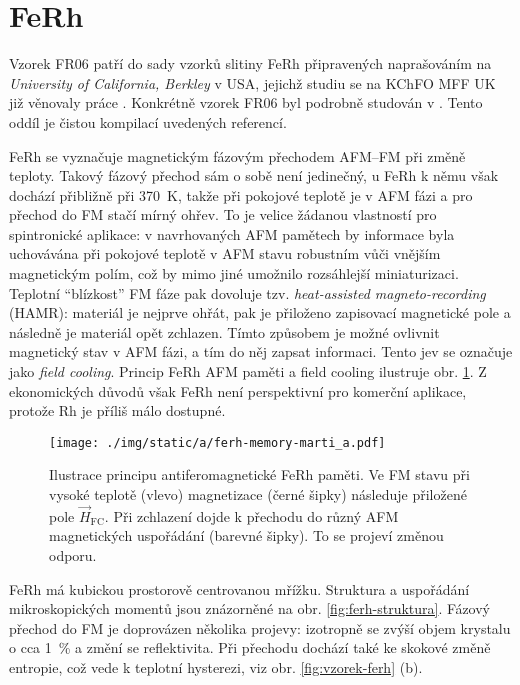 \section{FeRh}
\label{chap:vzorek-ferh}

Vzorek FR06 patří do sady vzorků slitiny FeRh připravených naprašováním na \emph{University of California, Berkley} v USA, jejichž studiu se na KChFO MFF UK již věnovaly práce \cite{brajerLaserovaSpektroskopieMaterialu2015,saidlUltrarychlaLaserovaSpektroskopie2018,kubascikMagnetooptickeStudiumAntiferomagnetickych2019,saidlInvestigationMagnetostructuralPhase2016}.
Konkrétně vzorek FR06 byl podrobně studován v \cite{saidlUltrarychlaLaserovaSpektroskopie2018,kubascikMagnetooptickeStudiumAntiferomagnetickych2019}.
Tento oddíl je čistou kompilací uvedených referencí.

FeRh se vyznačuje magnetickým fázovým přechodem AFM--FM při změ\-ně teploty.
Takový fázový přechod sám o sobě není jedinečný, u FeRh k němu však dochází přibližně při \SI{370}{\kelvin}, takže při pokojové teplotě je v AFM fázi a pro přechod do FM stačí mírný ohřev.
To je velice žádanou vlastností pro spintronické aplikace: v navrhovaných AFM pamětech by informace byla uchovávána při pokojové teplotě v AFM stavu robustním vůči vnějším magnetickým polím, což by mimo jiné umožnilo rozsáhlejší miniaturizaci.
Teplotní ``blízkost'' FM fáze pak dovoluje tzv. \emph{heat-assisted magneto-recording} (HAMR): materiál je nejprve ohřát, pak je přiloženo zapisovací magnetické pole a následně je materiál opět zchlazen.
Tímto způsobem je možné ovlivnit magnetický stav v AFM fázi, a tím do něj zapsat informaci.
Tento jev se označuje jako \emph{field cooling}.
Princip FeRh AFM paměti a field cooling ilustruje obr. \ref{fig:ferh-memory}.
Z ekonomických důvodů však FeRh není perspektivní pro komerční aplikace, protože Rh je příliš málo dostupné.

\begin{figure}[htbp]
    \centering
    \texttt{[image: ./img/static/a/ferh-memory-marti\_a.pdf]}
    \caption{Ilustrace principu antiferomagnetické FeRh paměti.
        Ve FM stavu při vysoké teplotě (vlevo) magnetizace (černé šipky) následuje přiložené pole $\vec{H}_\textrm{FC}$. 
        Při zchlazení dojde k přechodu do různý AFM magnetických uspořádání (barevné šipky). To se projeví změnou odporu. \cite{martiRoomtemperatureAntiferromagneticMemory2014}}
    \label{fig:ferh-memory}
\end{figure}

FeRh má kubickou prostorově centrovanou mřížku.
Struktura a uspořádání mikroskopických momentů jsou znázorněné na obr. \ref{fig:ferh-struktura}.
Fázový přechod do FM je doprovázen několika projevy: izotropně se zvýší objem krystalu o cca \SI{1}{\percent} a změní se reflektivita\cite{saidlInvestigationMagnetostructuralPhase2016}.
Při přechodu dochází také ke skokové změně entropie, což vede k teplotní hysterezi, viz obr. \ref{fig:vzorek-ferh} (b).

